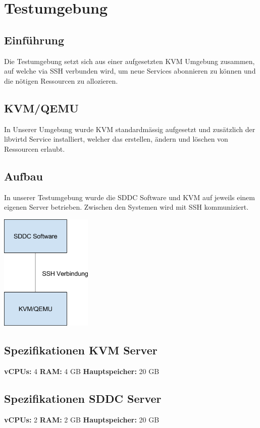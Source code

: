 \chapter{Testumgebung}

\section{Einführung}

Die Testumgebung setzt sich aus einer aufgesetzten KVM Umgebung zusammen, auf 
welche via SSH verbunden wird, um neue Services abonnieren zu können und die 
nötigen Ressourcen zu allozieren.

\section{KVM/QEMU}

In Unserer Umgebung wurde KVM standardmässig aufgesetzt und zusätzlich der 
libvirtd Service installiert, welcher das erstellen, ändern und löschen von 
Ressourcen erlaubt.

\section{Aufbau}

In unserer Testumgebung wurde die SDDC Software und KVM auf jeweils einem eigenen Server betrieben.
Zwischen den Systemen wird mit SSH kommuniziert.
\begin{center}
\includegraphics[width=0.33\textwidth]{./12_Appendix/images/kvm}
\end{center}

\section{Spezifikationen KVM Server}

\textbf{vCPUs:} 4
\textbf{RAM:} 4 GB
\textbf{Hauptspeicher:} 20 GB

\section{Spezifikationen SDDC Server}

\textbf{vCPUs:} 2
\textbf{RAM:} 2 GB
\textbf{Hauptspeicher:} 20 GB